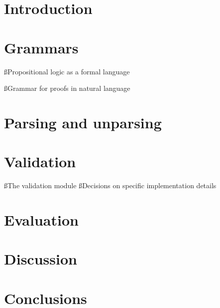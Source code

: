 \documentclass[a4paper]{article}
\title{\tit}
\begin{document}
\begin{titlepage}
\maketitle
\thispagestyle{empty}
\end{titlepage}

\fancyfoot[]{}



\pagebreak
\setcounter{tocdepth}{2}
\tableofcontents
\pagebreak
\lstlistoflistings
\pagebreak
\listoffigures
\clearpage
{}

\section{Introduction} %

\clearpage

\section{Grammars}\label{grams}
\ss{Propositional logic as a formal language}


\ss{Grammar for proofs in natural language}\label{nlgram}


\section{Parsing and unparsing}\label{punp}


\section{Validation}\label{vmod}
\ss{The validation module}
\ss{Decisions on specific implementation details}

\section{Evaluation}

\section{Discussion}

\section{Conclusions}
\end{document}
